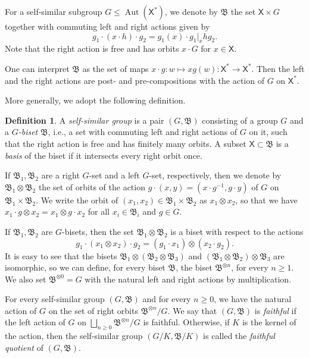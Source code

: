 \documentclass[11pt]{amsart}
\newcommand{\bim}{\mathfrak{B}}
\newcommand{\arr}{\longrightarrow}
\newcommand{\xs}{\alb^\ast}
\newcommand{\aut}{\ensuremath{\operatorname{Aut}}}%
\newcommand{\alb}{\ensuremath{\mathsf{X}}}%
\theoremstyle{definition}
\newtheorem{defin}{Definition}[section]
\theoremstyle{plain}
\newtheorem{main thm}{Theorem}
\theoremstyle{remark}
\theoremstyle{plain}
\begin{document}
        For a self-similar subgroup $G\le\aut(\alb^\ast)$, we denote by $\bim$ the set $\alb\times G$ together with commuting left and right actions given by
        \[g_1\cdot (x\cdot h)\cdot g_2=g_1(x)\cdot g_1|_xhg_2.\]
        Note that the right action is free and has orbits $x\cdot G$ for $x\in\alb$.

        One can interpret $\bim$ as the set of maps $x\cdot g\colon w\mapsto xg(w)\colon\xs\arr\xs$. Then the left and the right actions are post- and pre-compositions with the action of $G$ on $\alb^\ast$.

More generally, we adopt the following definition.

\begin{defin}
    A \emph{self-similar group} is a pair $(G, \bim)$ consisting of a group $G$ and a \emph{$G$-biset} $\bim$, i.e., a set with commuting left and right actions of $G$ on it, such that the right action is free and has finitely many orbits. A subset $\alb\subset\bim$ is a \emph{basis} of the biset if it intersects every right orbit once.
\end{defin}

If $\bim_1, \bim_2$ are a right $G$-set and a left $G$-set, respectively, then we denote by $\bim_1\otimes\bim_2$ the set of orbits of the action $g\cdot (x, y)=(x\cdot g^{-1}, g\cdot y)$ of $G$ on $\bim_1\times\bim_2$. We write the orbit of $(x_1, x_2)\in\bim_1\times\bim_2$ as $x_1\otimes x_2$, so that we have $x_1\cdot g\otimes x_2=x_1\otimes g\cdot x_2$ for all $x_i\in\bim_i$ and $g\in G$. 

If $\bim_1, \bim_2$ are $G$-bisets, then the set $\bim_1\otimes\bim_2$ is a biset with respect to the actions
\[g_1\cdot (x_1\otimes x_2)\cdot g_2=(g_1\cdot x_1)\otimes (x_2\cdot g_2).\]
It is easy to see that the bisets $\bim_1\otimes(\bim_2\otimes\bim_3)$ and $(\bim_1\otimes\bim_2)\otimes\bim_3$ are isomorphic, so we can define, for every biset $\bim$, the biset $\bim^{\otimes n}$, for every $n\ge 1$. We also set $\bim^{\otimes 0}=G$ with the natural left and right actions by multiplication.

For every self-similar group $(G, \bim)$ and for every $n\ge 0$, we have the natural action of $G$ on the set of right orbits $\bim^{\otimes n}/G$. We say that $(G, \bim)$ is \emph{faithful} if the left action of $G$ on $\bigsqcup_{n\ge 0}\bim^{\otimes n}/G$ is faithful. Otherwise, if $K$ is the kernel of the action, then the self-similar group $(G/K, \bim/K)$ is called the \emph{faithful quotient} of $(G, \bim)$.
\end{document}
